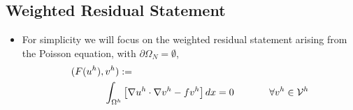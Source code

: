 \subsection*{Weighted Residual Statement}
\begin{frame}%
  \begin{itemize}
  \item {For simplicity we will focus on the weighted
    residual statement arising from the Poisson equation,
    with $\partial \Omega_N = \emptyset$, 
    \begin{eqnarray}
      \nonumber
      (F( u^h ), v^h) := \hspace{2.5in} \\  \nonumber
      \int_{\Omega^h}  \left[ \nabla u^h \cdot \nabla v^h - fv^h \right] dx %
      =0 \hspace{.5in} \forall v^{h} \in \mathcal{V}^{h}
    \end{eqnarray}
  }
  \end{itemize}
\end{frame}
